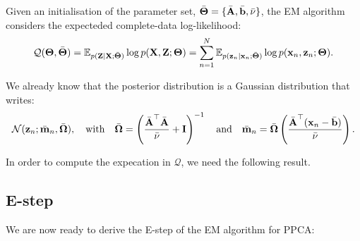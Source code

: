 Given an initialisation of the parameter set, $\bar{\boldsymbol{\mathbf{\Theta}}}=\{\bar{\boldsymbol{\mathbf{A}}},\bar{\boldsymbol{\mathbf{b}}},\bar{\nu}\}$, the EM algorithm considers the expecteded complete-data log-likelihood:
\begin{equation}
 \mathcal{Q}(\boldsymbol{\mathbf{\Theta}},\bar{\boldsymbol{\mathbf{\Theta}}}) =\mathbb{E}_{p(\boldsymbol{\mathbf{Z}}|\boldsymbol{\mathbf{X}};\bar{\boldsymbol{\mathbf{\Theta}}})} \log p(\boldsymbol{\mathbf{X}},\boldsymbol{\mathbf{Z}};\boldsymbol{\mathbf{\Theta}})  = \sum_{n=1}^N \mathbb{E}_{p(\boldsymbol{\mathbf{z}}_n|\boldsymbol{\mathbf{x}}_n;\bar{\boldsymbol{\mathbf{\Theta}}})} \log p(\boldsymbol{\mathbf{x}}_n,\boldsymbol{\mathbf{z}}_n;\boldsymbol{\mathbf{\Theta}}).
\end{equation}

We already know that the posterior distribution is a Gaussian distribution that writes:
\begin{equation}
\mathcal{N}(\boldsymbol{\mathbf{z}}_n;\bar{\boldsymbol{\mathbf{m}}}_n,\bar{\boldsymbol{\mathbf{\Omega}}}),
\quad\text{with}\quad  \bar{\boldsymbol{\mathbf{\Omega}}} = \left(\frac{\bar{\boldsymbol{\mathbf{A}}}^\top\bar{\boldsymbol{\mathbf{A}}}}{\bar{\nu}}+\boldsymbol{\mathbf{I}}\right)^{-1} \quad\text{and}\quad \bar{\boldsymbol{\mathbf{m}}}_n=\bar{\boldsymbol{\mathbf{\Omega}}}\left(\frac{\bar{\boldsymbol{\mathbf{A}}}^\top(\boldsymbol{\mathbf{x}}_n-\bar{\boldsymbol{\mathbf{b}}})}{\bar{\nu}}\right) .
\end{equation}

In order to compute the expecation in $\mathcal{Q}$, we need the following result.\vspace{2mm}

\vspace{2mm}

\subsection{E-step}

We are now ready to derive the E-step of the EM algorithm for PPCA:\vspace{2mm}

\vspace{2mm}

